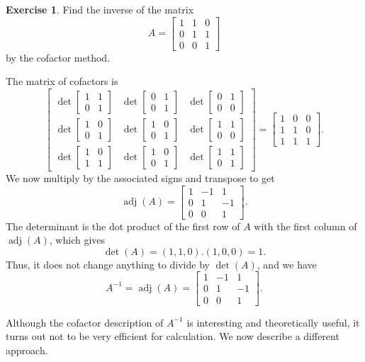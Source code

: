 \documentclass[a4paper]{book}
\newcommand{\bbm}       {\begin{bmatrix}}
\newcommand{\ebm}       {\end{bmatrix}}
\newcommand{\adj}       {\operatorname{adj}}
\renewcommand{\:}{\colon}
\theoremstyle{definition}
\newtheorem{exercise}[theorem]{Exercise}
\renewenvironment{solution}{\SolutionInline}{\endSolutionInline}
\begin{document}
\begin{exercise}
 Find the inverse of the matrix
 \[ A = \bbm 1&1&0\\ 0&1&1\\  0&0&1 \ebm \]
 by the cofactor method.
\end{exercise}
\begin{solution}
 The matrix of cofactors is
 \[ \bbm 
     \det\bbm 1&1\\ 0&1\ebm &
     \det\bbm 0&1\\ 0&1\ebm &
     \det\bbm 0&1\\ 0&0\ebm \\
     \det\bbm 1&0\\ 0&1\ebm &
     \det\bbm 1&0\\ 0&1\ebm &
     \det\bbm 1&1\\ 0&0\ebm \\
     \det\bbm 1&0\\ 1&1\ebm &
     \det\bbm 1&0\\ 0&1\ebm &
     \det\bbm 1&1\\ 0&1\ebm 
    \ebm = 
    \bbm 1 & 0 & 0 \\
         1 & 1 & 0 \\ 
         1 & 1 & 1 \ebm.
 \]
 We now multiply by the associated signs and transpose to get
 \[ \adj(A) = \bbm 1&-1&1 \\ 0&1&-1\\ 0&0&1 \ebm. \]
 The determinant is the dot product of the first row of $A$ with the
 first column of $\adj(A)$, which gives
 \[ \det(A) = (1,1,0).(1,0,0) = 1. \] 
 Thus, it does not change anything to divide by $\det(A)$, and we have
 \[ A^{-1} = \adj(A) = \bbm 1&-1&1 \\ 0&1&-1\\ 0&0&1 \ebm. \]
\end{solution}


Although the cofactor description of $A^{-1}$ is interesting and
theoretically useful, it turns out not to be very efficient for
calculation.  We now describe a different approach.
\end{document}
